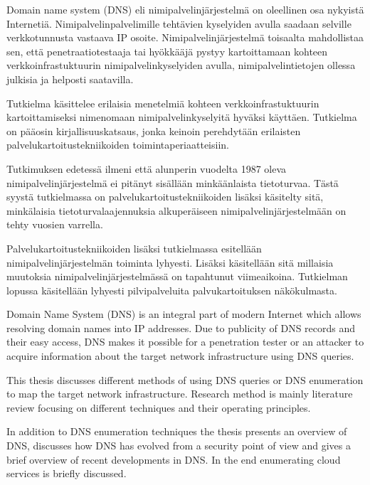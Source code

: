 %
%

\begin{fiabstract}
Domain name system (DNS) eli nimipalvelinjärjestelmä on oleellinen osa nykyistä Internetiä. Nimipalvelinpalvelimille tehtävien kyselyiden avulla saadaan selville verkkotunnusta vastaava IP osoite.  Nimipalvelinjärjestelmä toisaalta mahdollistaa sen, että penetraatiotestaaja tai hyökkääjä pystyy kartoittamaan kohteen verkkoinfrastuktuurin nimipalvelinkyselyiden avulla, nimipalvelintietojen ollessa julkisia ja helposti saatavilla. 

Tutkielma käsittelee erilaisia menetelmiä kohteen verkkoinfrastuktuurin kartoittamiseksi nimenomaan nimipalvelinkyselyitä hyväksi käyttäen. Tutkielma on pääosin kirjallisuuskatsaus, jonka keinoin perehdytään erilaisten palvelukartoitustekniikoiden toimintaperiaatteisiin.

Tutkimuksen edetessä ilmeni että alunperin vuodelta 1987 oleva nimipalvelinjärjestelmä ei pitänyt sisällään minkäänlaista tietoturvaa. Tästä syystä tutkielmassa on palvelukartoitustekniikoiden lisäksi käsitelty sitä, minkälaisia tietoturvalaajennuksia alkuperäiseen nimipalvelinjärjestelmään on tehty vuosien varrella.

Palvelukartoitustekniikoiden lisäksi tutkielmassa esitellään nimipalvelinjärjestelmän toiminta lyhyesti. Lisäksi käsitellään sitä millaisia muutoksia nimipalvelinjärjestelmässä on tapahtunut viimeaikoina. Tutkielman lopussa käsitellään lyhyesti pilvipalveluita palvukartoituksen näkökulmasta.


%
\end{fiabstract}


\begin{enabstract}
Domain Name System (DNS) is an integral part of modern Internet which allows resolving domain names into IP addresses. Due to publicity of DNS records and their easy access, DNS makes it possible for a penetration tester or an attacker to acquire information about the target network infrastructure using DNS queries.

This thesis discusses different methods of using DNS queries or DNS enumeration to map the target network infrastructure. Research method is mainly literature review focusing on different techniques and their operating principles. 

In addition to DNS enumeration techniques the thesis presents an overview of DNS, discusses how DNS has evolved from a security point of view and gives a brief overview of recent developments in DNS. In the end enumerating cloud services is briefly discussed.
\end{enabstract}
